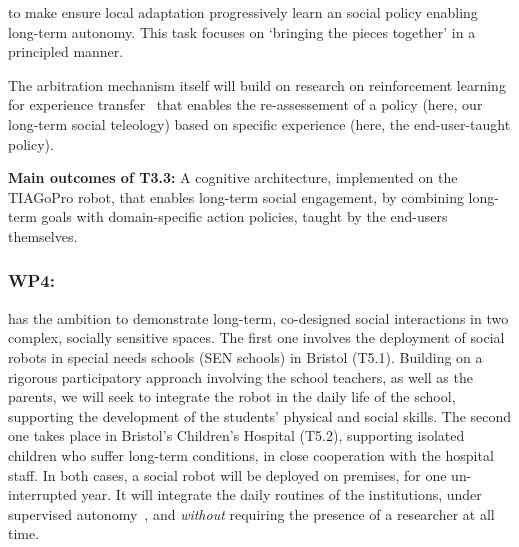 to make ensure local adaptation  progressively learn an social
policy enabling long-term autonomy. This task focuses on `bringing the pieces
together' in a principled manner.


The arbitration mechanism itself will build on research on reinforcement
learning for experience transfer~\cite{madden2004transfer} that enables the
re-assessement of a policy (here, our long-term social teleology) based on
specific experience (here, the end-user-taught policy).


\begin{framed}
    {\noindent\bf Main outcomes of T3.3:} A cognitive architecture, implemented
    on the TIAGoPro robot, that enables long-term social engagement, by combining
    long-term goals with domain-specific action policies, taught by the
    end-users themselves.
\end{framed}


\subsubsection{WP4: \textbf{\wpFour}}

\project has the ambition to demonstrate long-term, co-designed social
interactions in two complex, socially sensitive spaces.
The first one involves the deployment of social robots in special needs schools
(SEN schools) in Bristol (T5.1). Building on a rigorous participatory approach
involving the school teachers, as well as the parents, we will seek to integrate
the robot in the daily life of the school, supporting the development of the
students' physical and social skills. The second one takes place in Bristol's
Children's Hospital (T5.2), supporting isolated children who suffer long-term
conditions, in close cooperation with the hospital staff. In both cases, a
social robot will be deployed on premises, for one un-interrupted year. It will
integrate the daily routines of the institutions, under supervised
autonomy~\cite{senft2017supervised}, and \emph{without} requiring the
presence of a researcher at all time.

